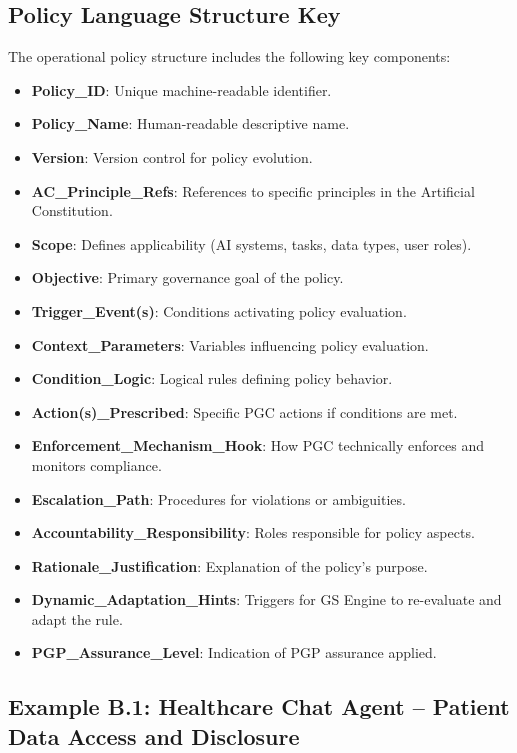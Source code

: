\documentclass[sigconf,review,anonymous=false]{acmart} %
\begin{document}
\subsection{Policy Language Structure Key}
\label{app:policy_examples_structure}
The operational policy structure includes the following key components:
\begin{itemize}
    \item \textbf{Policy\_ID}: Unique machine-readable identifier.
    \item \textbf{Policy\_Name}: Human-readable descriptive name.
    \item \textbf{Version}: Version control for policy evolution.
    \item \textbf{AC\_Principle\_Refs}: References to specific principles in the Artificial Constitution.
    \item \textbf{Scope}: Defines applicability (AI systems, tasks, data types, user roles).
    \item \textbf{Objective}: Primary governance goal of the policy.
    \item \textbf{Trigger\_Event(s)}: Conditions activating policy evaluation.
    \item \textbf{Context\_Parameters}: Variables influencing policy evaluation.
    \item \textbf{Condition\_Logic}: Logical rules defining policy behavior.
    \item \textbf{Action(s)\_Prescribed}: Specific PGC actions if conditions are met.
    \item \textbf{Enforcement\_Mechanism\_Hook}: How PGC technically enforces and monitors compliance.
    \item \textbf{Escalation\_Path}: Procedures for violations or ambiguities.
    \item \textbf{Accountability\_Responsibility}: Roles responsible for policy aspects.
    \item \textbf{Rationale\_Justification}: Explanation of the policy's purpose.
    \item \textbf{Dynamic\_Adaptation\_Hints}: Triggers for GS Engine to re-evaluate and adapt the rule.
    \item \textbf{PGP\_Assurance\_Level}: Indication of PGP assurance applied.
\end{itemize}

\subsection{Example B.1: Healthcare Chat Agent – Patient Data Access and Disclosure}
\label{app:policy_example_healthcare}
\end{document}
